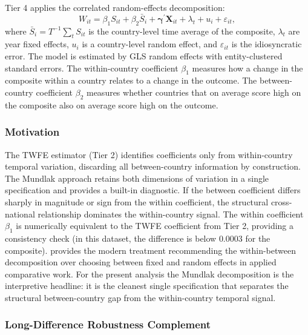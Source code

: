 \documentclass[12pt,a4paper]{article}
\begin{document}
Tier 4 applies the \citet{Mundlak1978} correlated random-effects decomposition:
\begin{equation}
W_{it} = \beta_1 S_{it} + \beta_2 \bar{S}_i + \boldsymbol{\gamma}^{\prime} \mathbf{X}_{it} + \lambda_t + u_i + \varepsilon_{it},
\end{equation}
where $\bar{S}_i = T^{-1} \sum_t S_{it}$ is the country-level time average of the composite, $\lambda_t$ are year fixed effects, $u_i$ is a country-level random effect, and $\varepsilon_{it}$ is the idiosyncratic error. The model is estimated by GLS random effects with entity-clustered standard errors. The within-country coefficient $\beta_1$ measures how a change in the composite within a country relates to a change in the outcome. The between-country coefficient $\beta_2$ measures whether countries that on average score high on the composite also on average score high on the outcome.

\subsubsection{Motivation}

The TWFE estimator (Tier 2) identifies coefficients only from within-country temporal variation, discarding all between-country information by construction. The Mundlak approach retains both dimensions of variation in a single specification and provides a built-in diagnostic. If the between coefficient differs sharply in magnitude or sign from the within coefficient, the structural cross-national relationship dominates the within-country signal. The within coefficient $\beta_1$ is numerically equivalent to the TWFE coefficient from Tier 2, providing a consistency check (in this dataset, the difference is below $0.0003$ for the composite). \citet{BellJones2015} provides the modern treatment recommending the within-between decomposition over choosing between fixed and random effects in applied comparative work. For the present analysis the Mundlak decomposition is the interpretive headline: it is the cleanest single specification that separates the structural between-country gap from the within-country temporal signal.

\subsubsection{Long-Difference Robustness Complement}
\end{document}
